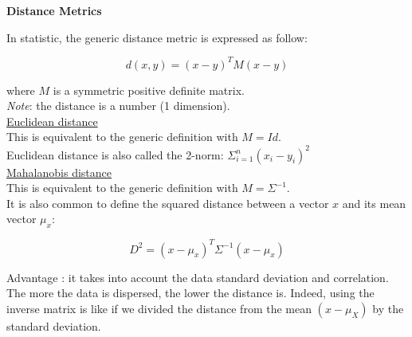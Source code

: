 {\fontsize{12pt}{22pt} \textbf{Distance Metrics}\par}

\vspace{5mm}

In statistic, the generic distance metric is expressed as follow:

$$d(x,y)=(x-y)^TM(x-y)$$

where $M$ is a symmetric positive definite matrix. \\

\textit{Note}: the distance is a number (1 dimension). \\

\underline{Euclidean distance} \\

This is equivalent to the generic definition with $M=Id$. \\

Euclidean distance is also called the 2-norm: $\Sigma_{i=1}^n (x_i - y_i)^2$ \\

\underline{Mahalanobis distance} \\

This is equivalent to the generic definition with $M=\Sigma^{-1}$. \\

It is also common to define the squared distance between a vector $x$ and its mean vector $\mu_x$:

$$D^2=(x-\mu_x)^T\Sigma^{-1}(x-\mu_x)$$

Advantage : it takes into account the data standard deviation and correlation. The more the data is dispersed, the lower the distance is. Indeed, using the inverse matrix is like if we divided the distance from the mean $(x-\mu_X)$ by the standard deviation.


\vspace{5mm}